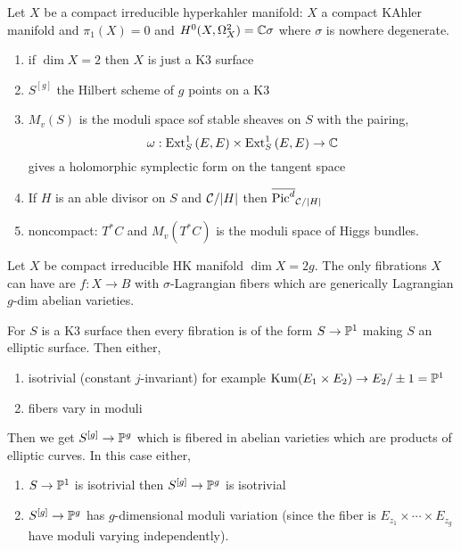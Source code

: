 \documentclass[12pt]{article}
\begin{document}
\begin{defn}
Let $X$ be a compact irreducible hyperkahler manifold: $X$ a compact KAhler manifold and $\pi_1(X) = 0$ and $H^0(X, \Omega^2_X) = \CC \sigma$ where $\sigma$ is nowhere degenerate.
\end{defn}

\begin{example}
\begin{enumerate}
\item if $\dim{X} = 2$ then $X$ is just a K3 surface
\item $S^{[g]}$ the Hilbert scheme of $g$ points on a K3
\item $M_v(S)$ is the moduli space sof stable sheaves on $S$ with the pairing,
\[ \omega : \Ext{1}{S}{E}{E} \times \Ext{1}{S}{E}{E} \to \CC \]
gives a holomorphic symplectic form on the tangent space
\item If $H$ is an able divisor on $S$ and $\C / |H|$ then $\overline{\mathrm{Pic}^d}_{\C/|H|}$

\item noncompact: $T^* C$ and $M_v(T^* C)$ is the moduli space of Higgs bundles.
\end{enumerate}
\end{example}

\begin{theorem}[Matsushita]
Let $X$ be compact irreducible HK manifold $\dim{X} = 2g$. The only fibrations $X$ can have are $f : X \to B$ with $\sigma$-Lagrangian fibers which are generically Lagrangian $g$-dim abelian varieties. 
\end{theorem} 

\begin{example}
For $S$ is a K3 surface then every fibration is of the form $S \to \P^1$ making $S$ an elliptic surface. Then either,
\begin{enumerate}
\item isotrivial (constant $j$-invariant) for example $\mathrm{Kum}(E_1 \times E_2) \to E_2 / \pm 1 = \P^1$
\item fibers vary in moduli
\end{enumerate}
Then we get $S^{[g]} \to \P^g$ which is fibered in abelian varieties which are products of elliptic curves. In this case either,
\begin{enumerate}
\item $S \to \P^1$ is isotrivial then $S^{[g]} \to \P^g$ is isotrivial
\item $S^{[g]} \to \P^g$ has $g$-dimensional moduli variation (since the fiber is $E_{z_1} \times \cdots \times E_{z_g}$ have moduli varying independently). 
\end{enumerate}
\end{example}
\end{document}
